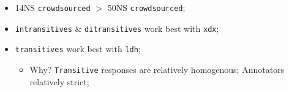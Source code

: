 \documentclass[handout,xcolor={dvipsnames}]{beamer}
\newcommand{\param}[1]{\texttt{#1}}
\begin{document}
\begin{frame}
\begin{itemize}
\pause
\item 14NS \param{crowdsourced} $>$ 50NS \param{crowdsourced};
\pause
\item \param{intransitives} \& \param{ditransitives} work best with \param{xdx};
\pause
\item \param{transitives} work best with \param{ldh};
\begin{itemize}
\pause
\item Why? \param{Transitive} responses are relatively homogenous; Annotators relatively strict;
\end{itemize}
\end{itemize}

\end{frame}

\end{document}
